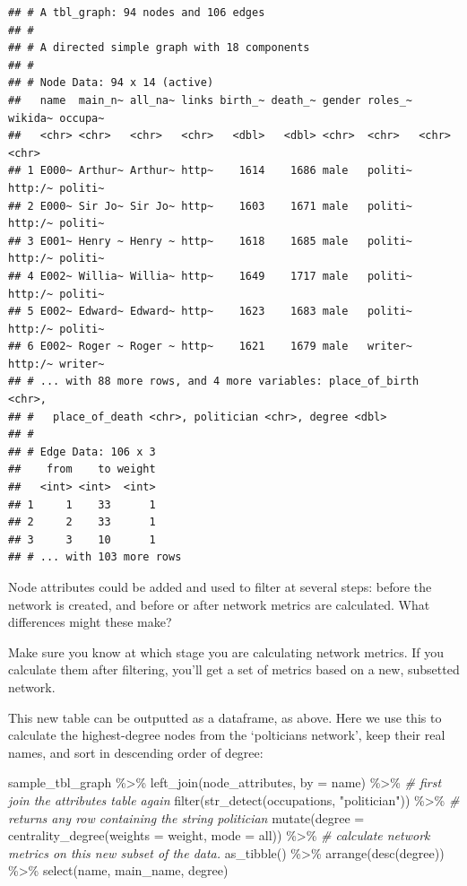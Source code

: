\documentclass[
]{book}
\newenvironment{Shaded}{\begin{snugshade}}{\end{snugshade}}
\newcommand{\AttributeTok}[1]{\textcolor[rgb]{0.77,0.63,0.00}{#1}}
\newcommand{\CommentTok}[1]{\textcolor[rgb]{0.56,0.35,0.01}{\textit{#1}}}
\newcommand{\FunctionTok}[1]{\textcolor[rgb]{0.00,0.00,0.00}{#1}}
\newcommand{\NormalTok}[1]{#1}
\newcommand{\SpecialCharTok}[1]{\textcolor[rgb]{0.00,0.00,0.00}{#1}}
\newcommand{\StringTok}[1]{\textcolor[rgb]{0.31,0.60,0.02}{#1}}
\begin{document}
\begin{verbatim}
## # A tbl_graph: 94 nodes and 106 edges
## #
## # A directed simple graph with 18 components
## #
## # Node Data: 94 x 14 (active)
##   name  main_n~ all_na~ links birth_~ death_~ gender roles_~ wikida~ occupa~
##   <chr> <chr>   <chr>   <chr>   <dbl>   <dbl> <chr>  <chr>   <chr>   <chr>  
## 1 E000~ Arthur~ Arthur~ http~    1614    1686 male   politi~ http:/~ politi~
## 2 E000~ Sir Jo~ Sir Jo~ http~    1603    1671 male   politi~ http:/~ politi~
## 3 E001~ Henry ~ Henry ~ http~    1618    1685 male   politi~ http:/~ politi~
## 4 E002~ Willia~ Willia~ http~    1649    1717 male   politi~ http:/~ politi~
## 5 E002~ Edward~ Edward~ http~    1623    1683 male   politi~ http:/~ politi~
## 6 E002~ Roger ~ Roger ~ http~    1621    1679 male   writer~ http:/~ writer~
## # ... with 88 more rows, and 4 more variables: place_of_birth <chr>,
## #   place_of_death <chr>, politician <chr>, degree <dbl>
## #
## # Edge Data: 106 x 3
##    from    to weight
##   <int> <int>  <int>
## 1     1    33      1
## 2     2    33      1
## 3     3    10      1
## # ... with 103 more rows
\end{verbatim}

Node attributes could be added and used to filter at several steps: before the network is created, and before or after network metrics are calculated. What differences might these make?

Make sure you know at which stage you are calculating network metrics. If you calculate them after filtering, you'll get a set of metrics based on a new, subsetted network.

This new table can be outputted as a dataframe, as above. Here we use this to calculate the highest-degree nodes from the `polticians network', keep their real names, and sort in descending order of degree:

\begin{Shaded}
\begin{Highlighting}[]
\NormalTok{sample\_tbl\_graph }\SpecialCharTok{\%\textgreater{}\%} 
  \FunctionTok{left\_join}\NormalTok{(node\_attributes, }\AttributeTok{by =} \StringTok{\textquotesingle{}name\textquotesingle{}}\NormalTok{) }\SpecialCharTok{\%\textgreater{}\%} \CommentTok{\# first join the attributes table again}
  \FunctionTok{filter}\NormalTok{(}\FunctionTok{str\_detect}\NormalTok{(occupations, }\StringTok{"politician"}\NormalTok{)) }\SpecialCharTok{\%\textgreater{}\%} \CommentTok{\# returns any row containing the string \textquotesingle{}politician\textquotesingle{}}
  \FunctionTok{mutate}\NormalTok{(}\AttributeTok{degree =} \FunctionTok{centrality\_degree}\NormalTok{(}\AttributeTok{weights =}\NormalTok{ weight, }\AttributeTok{mode =} \StringTok{\textquotesingle{}all\textquotesingle{}}\NormalTok{))  }\SpecialCharTok{\%\textgreater{}\%}   \CommentTok{\# calculate network metrics on this new subset of the data.}
\FunctionTok{as\_tibble}\NormalTok{() }\SpecialCharTok{\%\textgreater{}\%} 
  \FunctionTok{arrange}\NormalTok{(}\FunctionTok{desc}\NormalTok{(degree)) }\SpecialCharTok{\%\textgreater{}\%} \FunctionTok{select}\NormalTok{(name, main\_name, degree)}
\end{Highlighting}
\end{Shaded}
\end{document}
